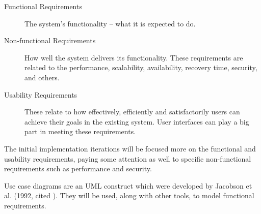 \begin{description} \item[Functional Requirements]
    The system's functionality -- what it is expected to do.
    
  \item[Non-functional Requirements]
    How well the system delivers its functionality. These requirements are
    related to the performance, scalability, availability, recovery time,
    security, and others.

  \item[Usability Requirements]
    These relate to how effectively, efficiently and satisfactorily users can
    achieve their goals in the existing system. User interfaces can play a big
    part in meeting these requirements.
\end{description}

The initial implementation iterations will be focused more on the functional
and usability requirements, paying some attention as well to specific
non-functional requirements such as performance and security.

Use case diagrams are an UML construct which were developed by Jacobson et al.
(1992, cited \cite[][p.~154]{bennett2010object}). They will be used, along with
other tools, to model functional requirements.
